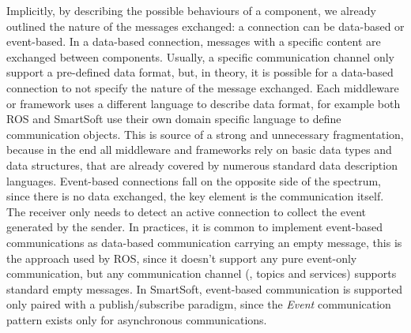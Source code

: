 Implicitly, by describing the possible behaviours of a component, we already outlined the nature of the messages exchanged: a connection can be data-based or event-based. In a data-based connection, messages with a specific content are exchanged between components. Usually, a specific communication channel only support a pre-defined data format, but, in theory, it is possible for a data-based connection to not specify the nature of the message exchanged. Each middleware or framework uses a different language to describe data format, for example both ROS  and SmartSoft use their own domain specific language to define communication objects. This is source of a strong and unnecessary fragmentation, because in the end all middleware and frameworks rely on basic data types and data structures, that are already covered by numerous standard data description languages. Event-based connections fall on the opposite side of the spectrum, since there is no data exchanged, the key element is the communication itself. The receiver only needs to detect an active connection to collect the event generated by the sender. In practices, it is common to implement event-based communications as data-based communication carrying an empty message, this is the approach used by ROS, since it doesn't support any pure event-only communication, but any communication channel (\ie, topics and services) supports standard empty messages. In SmartSoft, event-based communication is supported only paired with a publish/subscribe paradigm, since the \textit{Event} communication pattern exists only for asynchronous communications.

